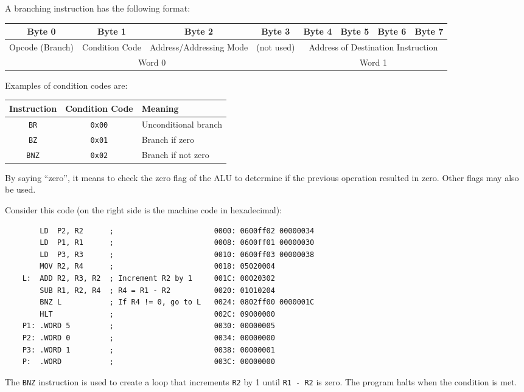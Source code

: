 \begin{enumerate}
A branching instruction has the following format:
\begin{table}[H]
    \centering
    \begin{tabular}{ccccclll}
    Byte 0                                & Byte 1                              & Byte 2                                         & Byte 3                          & Byte 4     & Byte 5     & Byte 6     & Byte 7    \\ \hline
    \multicolumn{1}{|c|}{Opcode (Branch)} & \multicolumn{1}{c|}{Condition Code} & \multicolumn{1}{c|}{Address/Addressing Mode} & \multicolumn{1}{c|}{(not used)} & \multicolumn{4}{c|}{Address of Destination Instruction} \\ \hline
    \multicolumn{4}{c}{Word 0}                                                                                                                                     & \multicolumn{4}{c}{Word 1}                      
    \end{tabular}
\end{table}

Examples of condition codes are:
\begin{table}[H]
    \centering
    \begin{tabular}{|c|c|l|}
    \hline
    \textbf{Instruction} & \textbf{Condition Code} & \textbf{Meaning} \\ \hline
    \texttt{BR} & \texttt{0x00} & Unconditional branch \\ \hline
    \texttt{BZ} & \texttt{0x01} & Branch if zero \\ \hline
    \texttt{BNZ} & \texttt{0x02} & Branch if not zero \\ \hline
    \end{tabular}
\end{table}
By saying ``zero'', it means to check the zero flag of the ALU to determine if the previous
operation resulted in zero. Other flags may also be used.

\begin{example}
    Consider this code (on the right side is the machine code in hexadecimal):
    \begin{verbatim}
        LD  P2, R2      ;                       0000: 0600ff02 00000034
        LD  P1, R1      ;                       0008: 0600ff01 00000030
        LD  P3, R3      ;                       0010: 0600ff03 00000038
        MOV R2, R4      ;                       0018: 05020004
    L:  ADD R2, R3, R2  ; Increment R2 by 1     001C: 00020302
        SUB R1, R2, R4  ; R4 = R1 - R2          0020: 01010204
        BNZ L           ; If R4 != 0, go to L   0024: 0802ff00 0000001C
        HLT             ;                       002C: 09000000 
    P1: .WORD 5         ;                       0030: 00000005
    P2: .WORD 0         ;                       0034: 00000000
    P3: .WORD 1         ;                       0038: 00000001
    P:  .WORD           ;                       003C: 00000000
    \end{verbatim}
    The \texttt{BNZ} instruction is used to create a loop that increments \texttt{R2} by 1
    until \texttt{R1 - R2} is zero. The program halts when the condition is met.
\end{example}


\end{enumerate}
